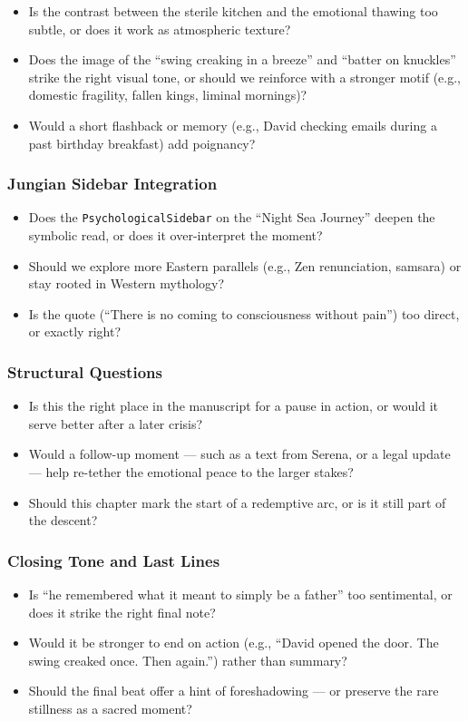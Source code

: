 \begin{itemize}
  \item Is the contrast between the sterile kitchen and the emotional thawing too subtle, or does it work as atmospheric texture?
  \item Does the image of the ``swing creaking in a breeze'' and ``batter on knuckles'' strike the right visual tone, or should we reinforce with a stronger motif (e.g., domestic fragility, fallen kings, liminal mornings)?
  \item Would a short flashback or memory (e.g., David checking emails during a past birthday breakfast) add poignancy?
\end{itemize}

\subsubsection*{Jungian Sidebar Integration}

\begin{itemize}
  \item Does the \texttt{PsychologicalSidebar} on the ``Night Sea Journey'' deepen the symbolic read, or does it over-interpret the moment?
  \item Should we explore more Eastern parallels (e.g., Zen renunciation, samsara) or stay rooted in Western mythology?
  \item Is the quote (“There is no coming to consciousness without pain”) too direct, or exactly right?
\end{itemize}

\subsubsection*{Structural Questions}

\begin{itemize}
  \item Is this the right place in the manuscript for a pause in action, or would it serve better after a later crisis?
  \item Would a follow-up moment — such as a text from Serena, or a legal update — help re-tether the emotional peace to the larger stakes?
  \item Should this chapter mark the start of a redemptive arc, or is it still part of the descent?
\end{itemize}

\subsubsection*{Closing Tone and Last Lines}

\begin{itemize}
  \item Is ``he remembered what it meant to simply be a father'' too sentimental, or does it strike the right final note?
  \item Would it be stronger to end on action (e.g., ``David opened the door. The swing creaked once. Then again.'') rather than summary?
  \item Should the final beat offer a hint of foreshadowing — or preserve the rare stillness as a sacred moment?
\end{itemize}
